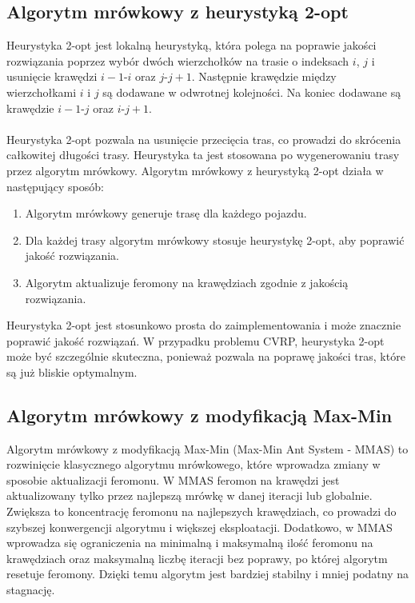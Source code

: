 \documentclass{article}
\begin{document}
\subsection{Algorytm mrówkowy z heurystyką 2-opt}
Heurystyka 2-opt jest lokalną heurystyką, która polega na poprawie jakości rozwiązania poprzez wybór dwóch wierzchołków na trasie o indeksach $i$, $j$ i usunięcie krawędzi $i - 1$-$i$ oraz $j$-$j+1$. Następnie krawędzie między wierzchołkami $i$ i $j$ są dodawane w odwrotnej kolejności. Na koniec dodawane są krawędzie $i-1$-$j$ oraz $i$-$j+1$.
\\ \\
Heurystyka 2-opt pozwala na usunięcie przecięcia tras, co prowadzi do skrócenia całkowitej długości trasy. Heurystyka ta jest stosowana po wygenerowaniu trasy przez algorytm mrówkowy. Algorytm mrówkowy z heurystyką 2-opt działa w następujący sposób:
\begin{enumerate}
    \item Algorytm mrówkowy generuje trasę dla każdego pojazdu.
    \item Dla każdej trasy algorytm mrówkowy stosuje heurystykę 2-opt, aby poprawić jakość rozwiązania.
    \item Algorytm aktualizuje feromony na krawędziach zgodnie z jakością rozwiązania.
\end{enumerate}
Heurystyka 2-opt jest stosunkowo prosta do zaimplementowania i może znacznie poprawić jakość rozwiązań. W przypadku problemu CVRP, heurystyka 2-opt może być szczególnie skuteczna, ponieważ pozwala na poprawę jakości tras, które są już bliskie optymalnym.

\subsection{Algorytm mrówkowy z modyfikacją Max-Min}

Algorytm mrówkowy z modyfikacją Max-Min (Max-Min Ant System - MMAS) to rozwinięcie klasycznego algorytmu mrówkowego, które wprowadza zmiany w sposobie aktualizacji feromonu. W MMAS feromon na krawędzi jest aktualizowany tylko przez najlepszą mrówkę w danej iteracji lub globalnie. Zwiększa to koncentrację feromonu na najlepszych krawędziach, co prowadzi do szybszej konwergencji algorytmu i większej eksploatacji. Dodatkowo, w MMAS wprowadza się ograniczenia na minimalną i maksymalną ilość feromonu na krawędziach oraz maksymalną liczbę iteracji bez poprawy, po której algorytm resetuje feromony. Dzięki temu algorytm jest bardziej stabilny i mniej podatny na stagnację. 
\end{document}
